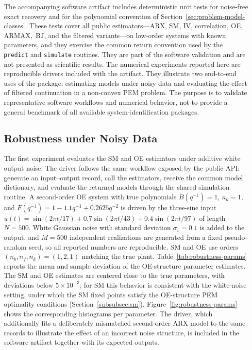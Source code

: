 \documentclass[acmsmall,screen,review]{acmart}
\begin{document}
The accompanying software artifact includes deterministic unit tests for
noise-free exact recovery and for the polynomial convention of
Section~\ref{sec:problem-model-classes}.  These tests cover all public
estimators---ARX, SM, IV, correlation, OE, ARMAX,~BJ, and the filtered
variants---on low-order systems with known parameters, and they exercise the
common return convention used by the \texttt{predict} and \texttt{simulate}
routines.
They are part of the software validation and are not presented as
scientific results.  The numerical experiments reported here are reproducible
drivers included with the artifact.  They illustrate two end-to-end uses of
the package: estimating models under noisy data and evaluating the effect of
filtered continuation in a non-convex PEM problem.  The purpose is
to validate representative software workflows and numerical behavior, not to
provide a general benchmark of all available system-identification packages.

\subsection{Robustness under Noisy Data}
\label{subsec:robustness-noisy-data}

The first experiment evaluates the SM and OE estimators under additive
white output noise.
The driver follows the same workflow exposed by the public API: generate an
input--output record, call the estimators, receive the common model dictionary,
and evaluate the returned models through the shared simulation routine.
A second-order OE system with true polynomials
\(B(q^{-1})=1\), \(n_k=1\), and
\(F(q^{-1}) = 1 - 1.1q^{-1} + 0.2625q^{-2}\) is driven by the three-sine
input
\(u(t) = \sin(2\pi t/17) + 0.7\sin(2\pi t/43) + 0.4\sin(2\pi t/97)\)
of length \(N=500\).
White Gaussian noise with standard deviation $\sigma_v = 0.1$ is added
to the output, and $M=500$ independent realizations are generated from a
fixed pseudo-random seed, so all reported numbers are reproducible.
SM and OE use orders $(n_b,n_f,n_k) = (1,2,1)$ matching the true plant.
Table~\ref{tab:robustness-params} reports the mean and
sample deviation of the OE-structure parameter estimates.
The SM and OE estimates are centered close to the true parameters,
with deviations below $5 \times 10^{-3}$; for SM this behavior is
consistent with the white-noise setting, under which the SM fixed points
satisfy the OE-structure PEM optimality conditions
(Section~\ref{subsubsec:sm}).
Figure~\ref{fig:robustness-params} shows the corresponding
histograms per parameter.
The driver, which additionally fits a deliberately mismatched second-order
ARX model to the same records to illustrate the effect of an incorrect
noise structure, is included in the software artifact together with its
expected outputs.
\end{document}
